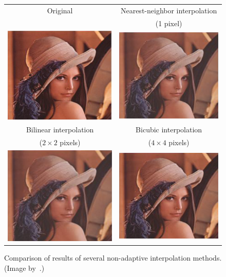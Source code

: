 \begin{figure}[t]
\centering
{\sffamily
\begin{tabular}{cc}
Original & Nearest-neighbor interpolation\\
 & (1 pixel) \\
\includegraphics[width=.4\linewidth]{img/preprocessing/interp_orig.png}
&
\includegraphics[width=.4\linewidth]{img/preprocessing/interp_nn.png}
\vspace{1em} \\
Bilinear interpolation & Bicubic interpolation \\
($2\times2$ pixels) & ($4\times4$ pixels) \\
\includegraphics[width=.4\linewidth]{img/preprocessing/interp_bili.png}
&
\includegraphics[width=.4\linewidth]{img/preprocessing/interp_bicubic.png}
\end{tabular}
}
\caption{Comparison of results of several non-adaptive interpolation methods. (Image by~\citet{prajapati2012evaluation}.) }
\label{fig:preprocessInterpolation}
\end{figure}

